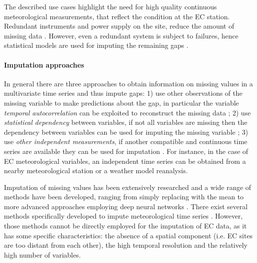 \documentclass{article}
\begin{document}
The described use cases highlight the need for high quality continuous meteorological measurements, that reflect the condition at the EC station. Redundant instruments and power supply on the site, reduce the amount of missing data \cite{aubinet_eddy_2012-1}. However, even a redundant system is subject to failures, hence statistical models are used for imputing the remaining gaps \cite{aubinet_eddy_2012-1}.

\paragraph{Imputation approaches} In general there are three approaches to obtain information on missing values in a multivariate time series and thus impute gaps:
1) use other observations of the missing variable to make predictions about the gap, in particular the variable \emph{temporal autocorrelation} can be exploited to reconstruct the missing data \cite{moritz_comparison_nodate};
2) use \emph{statistical dependency} between variables, if not all variables are missing then the dependency between variables can be used for imputing the missing variable \cite{moffat_comprehensive_2007};
3) use \emph{other independent measurements}, if another compatible and continuous time series are available they can be used for imputation \cite{vuichard_filling_2015}. For instance, in the case of EC meteorological variables, an independent time series can be obtained from a nearby meteorological station or a weather model reanalysis.

Imputation of missing values has been extensively researched and a wide range of methods have been developed, ranging from simply replacing with the mean to more advanced approaches employing deep neural networks \cite{moritz_r_2017, fang_time_2020-1, buuren_mice_2011, du_saits_2022-1, zhang_dual-head_2021-2, cao_brits_nodate}. There exist several methods specifically developed to impute meteorological time series \cite{costa_gap_2021, jing_multi-imputation_2022}. However, those methods cannot be directly employed for the imputation of EC data, as it has some specific characteristics: the absence of a spatial component (i.e. EC sites are too distant from each other), the high temporal resolution and the relatively high number of variables.
\end{document}
